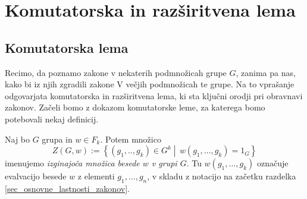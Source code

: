 

\section{Komutatorska in razširitvena lema}

\subsection{Komutatorska lema}



Recimo, da poznamo zakone v nekaterih podmnožicah grupe $G$, zanima pa nas, kako bi iz njih zgradili zakone V večjih podmnožicah te grupe. Na to vprašanje odgovarjata komutatorska in razširitvena lema,
ki sta ključni orodji pri obravnavi zakonov. Začeli bomo z dokazom komutatorske leme, za katerega bomo potebovali nekaj definicij.

\begin{definicija}
    \label{def_izginjajoca_mnozica}
    Naj bo $G$ grupa in $w \in  F_k$. Potem množico \begin{equation*}
    Z(G, w) := \left\{ (g_1, .., g_{k}) \in  G^{k}  \middle|\, w(g_1, \ldots, g_{k}) = 1_G \right\} 
    \end{equation*}  
    imenujemo \emph{izginajoča množica besede $w$ v grupi $G$}. Tu $w(g_1, \ldots, g_{k})$ označuje evalvacijo besede $w$ z elementi $g_1, \ldots, g_n$, v skladu z notacijo na začetku razdelka \ref{sec_osnovne_lastnosti_zakonov}.  
    \end{definicija}





